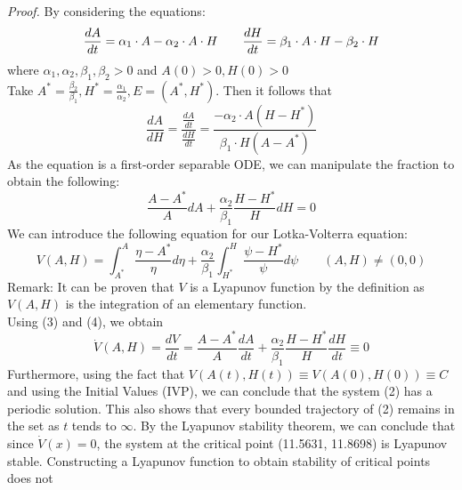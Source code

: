 \documentclass{article}
\begin{document}
\\\newline
\noindent\\
\textit{Proof.}
By considering the equations:
\begin{equation}
    \frac{dA}{dt} =\alpha_1\cdot A-\alpha_2\cdot A\cdot H\qquad
    \frac{dH}{dt} =\beta_1\cdot A\cdot H-\beta_2\cdot H\\
\end{equation}
where $\alpha_1,\alpha_2,\beta_1,\beta_2>0$ and $A(0)>0, H(0)>0$\\
\newline
Take $A^*=\frac{\beta_2}{\beta_1}, H^*=\frac{\alpha_1}{\alpha_2}, E=(A^*,H^*)$. Then it follows that
\begin{equation*}
    \frac{dA}{dH}=\frac{\frac{dA}{dt}}{\frac{dH}{dt}}=\frac{-\alpha_2\cdot A(H-H^*)}{\beta_1\cdot H(A-A^*)}
\end{equation*}
As the equation is a first-order separable ODE, we can manipulate the fraction to obtain the following:
\begin{equation}
    \frac{A-A^*}{A}dA+\frac{\alpha_2}{\beta_1}\frac{H-H^*}{H}dH=0
\end{equation}
\noindent
We can introduce the following equation for our Lotka-Volterra equation:
\begin{equation}
    V(A,H)=\int_{A^*}^{A}\frac{\eta -A^*}{\eta}d\eta+\frac{\alpha_2}{\beta_1}\int_{H^*}^H\frac{\psi-H^*}{\psi}d\psi\qquad(A,H)\neq(0,0)
\end{equation}
Remark: It can be proven that $V$ is a Lyapunov function by the definition as $V(A,H)$ is the integration of an elementary function. \\\newline
Using (3) and (4), we obtain
\begin{equation*}
    \dot{V}(A,H)=\frac{dV}{dt}=\frac{A-A^*}{A}\frac{dA}{dt}+\frac{\alpha_2}{\beta_1}\frac{H-H^*}{H}\frac{dH}{dt}\equiv 0
\end{equation*}
Furthermore, using the fact that $V(A(t),H(t))\equiv V(A(0),H(0))\equiv C$ and using the Initial Values (IVP), we can conclude that the system (2) has a periodic solution. This also shows that every bounded trajectory of (2) remains in the set as $t$ tends to $\infty$.
\newline
\newline \noindent
By the Lyapunov stability theorem, we can conclude that since $\dot{V}(x)=0$, the system at the critical point (11.5631, 11.8698) is Lyapunov stable.
Constructing  a  Lyapunov  function  to  obtain  stability  of  critical  points  does  not
\end{document}
